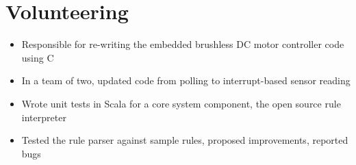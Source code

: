 \documentclass[]{rcf_cv}
\begin{document}
	\section{Volunteering}
	
		\begin{itemize}
			\setlength\itemsep{-0.4em}
			\renewcommand\labelitemi{--}
			
			\item Responsible for re-writing the embedded brushless DC motor controller code using C
			\item In a team of two, updated code from polling to interrupt-based sensor reading
			
		\end{itemize}
	
		\begin{itemize}
			\setlength\itemsep{-0.4em}
			\renewcommand\labelitemi{--}
			
			\item Wrote unit tests in Scala for a core system component, the open source rule interpreter
			\item Tested the rule parser against sample rules, proposed improvements, reported bugs

		\end{itemize}

	


	
\end{document}
